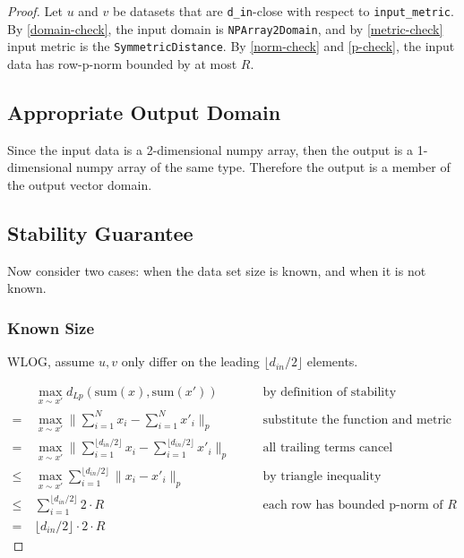 \documentclass{article}
\begin{document}
\begin{proof} 

Let $u$ and $v$ be datasets that are \texttt{d\_in}-close with respect to \texttt{input\_metric}.
By \ref{domain-check}, the input domain is \texttt{NPArray2Domain},
and by \ref{metric-check} input metric is the \texttt{SymmetricDistance}. 
By \ref{norm-check} and \ref{p-check}, the input data has row-p-norm bounded by at most $R$.


\subsection{Appropriate Output Domain}

Since the input data is a 2-dimensional numpy array, then the output is a 1-dimensional numpy array of the same type.
Therefore the output is a member of the output vector domain.

\subsection{Stability Guarantee}

Now consider two cases: when the data set size is known, and when it is not known.

\subsubsection{Known Size}
    WLOG, assume $u, v$ only differ on the leading $\lfloor d_{in} / 2 \rfloor$ elements.

    \begin{align}
        & \ \max_{x \sim x'} d_{Lp}(\mathrm{sum}(x), \mathrm{sum}(x')) && \quad \text{by definition of stability}\\
        =&\ \max_{x \sim x'} \lVert\sum_{i = 1}^N x_i - \sum_{i = 1}^{N} x'_i \rVert_p && \quad \text{substitute the function and metric} \\
        =&\ \max_{x \sim x'} \lVert\sum_{i = 1}^{\lfloor d_{in} / 2 \rfloor} x_{i} - \sum_{i = 1}^{\lfloor d_{in} / 2 \rfloor} x'_{i}\rVert_p && \quad\text{all trailing terms cancel} \\
        \le&\ \max_{x \sim x'} \sum_{i = 1}^{\lfloor d_{in} / 2 \rfloor} \lVert x_i - x'_{i} \rVert_p && \quad \text{by triangle inequality} \\
        \le&\ \sum_{i = 1}^{\lfloor d_{in} / 2 \rfloor} 2 \cdot R && \quad\text{each row has bounded p-norm of } R \\
        =&\ \lfloor d_{in} / 2 \rfloor \cdot 2 \cdot R
    \end{align}


\end{proof}
\end{document}
